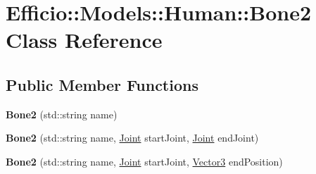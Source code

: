 \hypertarget{class_efficio_1_1_models_1_1_human_1_1_bone2}{}\section{Efficio\+:\+:Models\+:\+:Human\+:\+:Bone2 Class Reference}
\label{class_efficio_1_1_models_1_1_human_1_1_bone2}
\subsection*{Public Member Functions}
\begin{DoxyCompactItemize}
\item 
{\bfseries Bone2} (std\+::string name)\hypertarget{class_efficio_1_1_models_1_1_human_1_1_bone2_a3958c7a1c4690b707819d58bd096bc42}{}\label{class_efficio_1_1_models_1_1_human_1_1_bone2_a3958c7a1c4690b707819d58bd096bc42}

\item 
{\bfseries Bone2} (std\+::string name, \hyperlink{class_efficio_1_1_models_1_1_human_1_1_joint}{Joint} start\+Joint, \hyperlink{class_efficio_1_1_models_1_1_human_1_1_joint}{Joint} end\+Joint)\hypertarget{class_efficio_1_1_models_1_1_human_1_1_bone2_a3d7ef587a3961a634a0a1c3a1d23828a}{}\label{class_efficio_1_1_models_1_1_human_1_1_bone2_a3d7ef587a3961a634a0a1c3a1d23828a}

\item 
{\bfseries Bone2} (std\+::string name, \hyperlink{class_efficio_1_1_models_1_1_human_1_1_joint}{Joint} start\+Joint, \hyperlink{class_efficio_1_1_vector3}{Vector3} end\+Position)\hypertarget{class_efficio_1_1_models_1_1_human_1_1_bone2_ab38dfa178a212677ef28c11ff9bcfde9}{}\label{class_efficio_1_1_models_1_1_human_1_1_bone2_ab38dfa178a212677ef28c11ff9bcfde9}

\end{DoxyCompactItemize}
